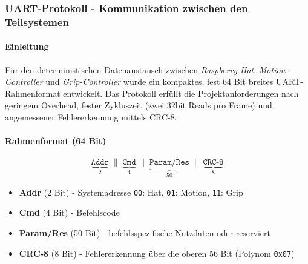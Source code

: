 \documentclass[main.tex]{subfiles} %
\begin{document}
\subsubsection{UART-Protokoll - Kommunikation zwischen den Teilsystemen}

\paragraph{Einleitung}
Für den deterministischen Datenaustausch zwischen \emph{Raspberry-Hat},
\emph{Motion-Controller} und \emph{Grip-Controller} wurde ein kompaktes,
fest 64 Bit breites UART-Rahmenformat entwickelt. Das Protokoll erfüllt
die Projektanforderungen nach geringem Overhead, fester Zykluszeit
(zwei 32bit Reads pro Frame) und angemessener Fehlererkennung mittels
CRC-8.

\bigskip
\paragraph{Rahmenformat (64 Bit)}
\[
  \underbrace{\texttt{Addr}}_{2}
  \;\|\;
  \underbrace{\texttt{Cmd}}_{4}
  \;\|\;
  \underbrace{\texttt{Param/Res}}_{50}
  \;\|\;
  \underbrace{\texttt{CRC-8}}_{8}
\]

\begin{itemize}\setlength\itemsep{0.25em}
  \item \textbf{Addr} (2 Bit) - Systemadresse
    \texttt{00}: Hat,\; \texttt{01}: Motion,\;
    \texttt{11}: Grip
  \item \textbf{Cmd} (4 Bit) - Befehlscode
  \item \textbf{Param/Res} (50 Bit) - befehlsspezifische Nutzdaten
    oder reserviert
  \item \textbf{CRC-8} (8 Bit) - Fehlererkennung über die oberen
    56 Bit (Polynom \texttt{0x07})
\end{itemize}

\end{document}
